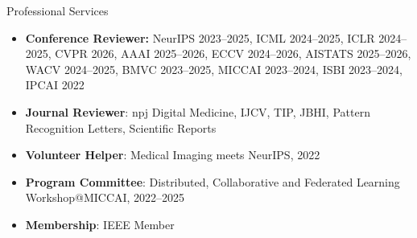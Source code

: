 \documentclass[a4paper]{resume} %
\begin{document}
\begin{rSection}{Professional Services}

\begin{itemize}

\item {\bf Conference Reviewer:} NeurIPS 2023--2025, ICML 2024--2025, ICLR 2024--2025,  CVPR 2026,  AAAI 2025--2026, ECCV 2024--2026, AISTATS 2025--2026, WACV 2024--2025, BMVC 2023--2025, MICCAI 2023--2024, ISBI 2023--2024, IPCAI 2022
\item {\bf Journal Reviewer}: npj Digital Medicine, IJCV, TIP, JBHI, Pattern Recognition Letters, Scientific Reports
\item {\bf Volunteer Helper}: Medical Imaging meets NeurIPS, 2022
\item {\bf Program Committee}: Distributed, Collaborative and Federated Learning Workshop@MICCAI, 2022--2025
\item {\bf Membership}: IEEE Member

\end{itemize}



\end{rSection}
\end{document}
